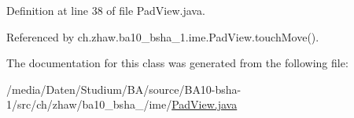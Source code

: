 Definition at line 38 of file PadView.java.

Referenced by ch.zhaw.ba10\_\-bsha\_\-1.ime.PadView.touchMove().

The documentation for this class was generated from the following file:\begin{DoxyCompactItemize}
\item 
/media/Daten/Studium/BA/source/BA10-\/bsha-\/1/src/ch/zhaw/ba10\_\-bsha\_/ime/\hyperlink{PadView_8java}{PadView.java}\end{DoxyCompactItemize}
